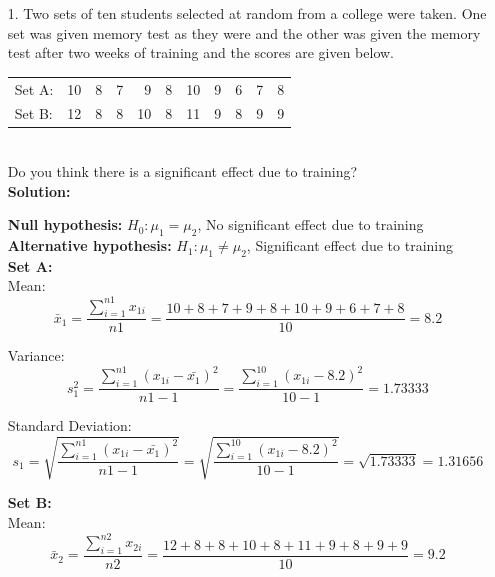 \documentclass[a4paper,11pt,openright]{report}
\begin{document}
\begin{enumerate}

\item[1.] Two sets of ten students selected at random from a college were taken. One set was
given memory test as they were and the other was given the memory test after two weeks of
training and the scores are given below. \\
\begin{tabular}{lrrrrrrrrrr}
Set A: & 10 & 8 & 7 & 9 & 8 & 10 & 9 & 6 & 7 & 8 \\ 
Set B: & 12 & 8 & 8 & 10 & 8 & 11 & 9 & 8 & 9 & 9 \\
\end{tabular} \\
Do you think there is a significant effect due to training? \\

\textbf{Solution:}

\textbf{Null hypothesis:} $H_{0}: \mu_{1} = \mu_{2}$, No significant effect due to training \\
\textbf{Alternative hypothesis:} $H_{1}: \mu_{1} \neq \mu_{2}$, Significant effect due to training \\

\textbf{Set A:} \\ 
\hspace*{10mm} Mean:
\begin{equation*}
\bar x_{1} = \frac{\sum\limits_{i=1}^{n1} x_{1i}}{n1}
    	= \frac{10 + 8 + 7 + 9 + 8 + 10 + 9 + 6 + 7 + 8}{10}
    	= 8.2
\end{equation*}

\hspace*{10mm} Variance:
\begin{equation*}
s_{1}^{2} = \frac{\sum\limits_{i=1}^{n1} (x_{1i} - \bar {x_{1}})^{2}}{n1 - 1}
		= \frac{\sum\limits_{i=1}^{10} (x_{1i} - 8.2)^{2}}{10 -1} = 1.73333
\end{equation*}

\hspace*{10mm} Standard Deviation:
\begin{equation*}
s_{1} = \sqrt{\frac{\sum\limits_{i=1}^{n1} (x_{1i} - \bar {x_{1}})^{2}}{n1 - 1}}
	= \sqrt{\frac{\sum\limits_{i=1}^{10} (x_{1i} - 8.2)^{2}}{10 -1}}
	= \sqrt{1.73333} = 1.31656
\end{equation*}

\textbf{Set B:} \\
\hspace*{10mm} Mean:
\begin{equation*}
\bar x_{2} = \frac{\sum\limits_{i=1}^{n2} x_{2i}}{n2}
	= \frac{12 + 8 + 8 + 10 + 8 + 11 + 9 + 8 + 9 + 9}{10}
	= 9.2
\end{equation*}


\end{enumerate}
\end{document}
